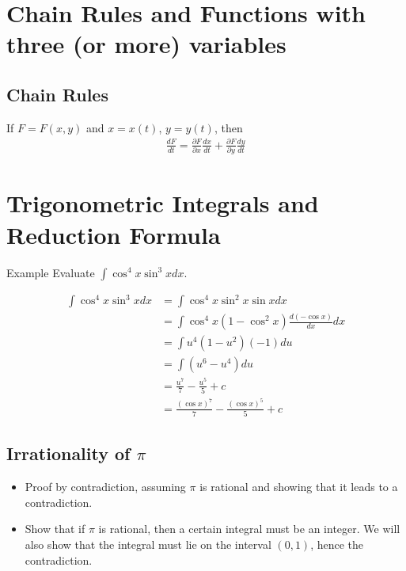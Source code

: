 \documentclass{report}
\begin{document}
\chapter{Chain Rules and Functions with three (or more) variables}

	\section{Chain Rules}

		If $F = F(x,y)$ and $x = x(t)$, $y = y(t)$, then
			\begin{align*}
				\frac{dF}{dt} = \frac{\partial F}{\partial x} \frac{dx}{dt} + \frac{\partial F}{\partial y} \frac{dy}{dt}
			\end{align*}

\chapter{Trigonometric Integrals and Reduction Formula}

	\begin{question}{Example}
		Evaluate $\int \cos^4 x \sin^3 x dx$.
			
			\begin{align*}
				\int \cos^4 x \sin^3 x dx &= \int \cos^4 x \sin^2x \sin x dx	\\
										  &= \int \cos^4 x (1 - \cos^2 x) \frac{d(-\cos x)}{dx} dx	\\
										  &= \int u^4 (1 - u^2)(-1) du	\\
										  &= \int (u^6 - u^4) du	\\
										  &= \frac{u^7}{7} - \frac{u^5}{5} + c	\\
										  &= \frac{{(\cos x)}^7}{7} - \frac{{(\cos x)}^5}{5} + c
			\end{align*}
	\end{question}

	\section{Irrationality of $\pi$}
		
		\begin{itemize}
			\item Proof by contradiction, assuming $\pi$ is rational and showing that it leads to a contradiction.
			\item Show that if $\pi$ is rational, then a certain integral must be an integer. We will also show that the integral must lie on the interval $(0,1)$, hence the contradiction.
		\end{itemize}
\end{document}
